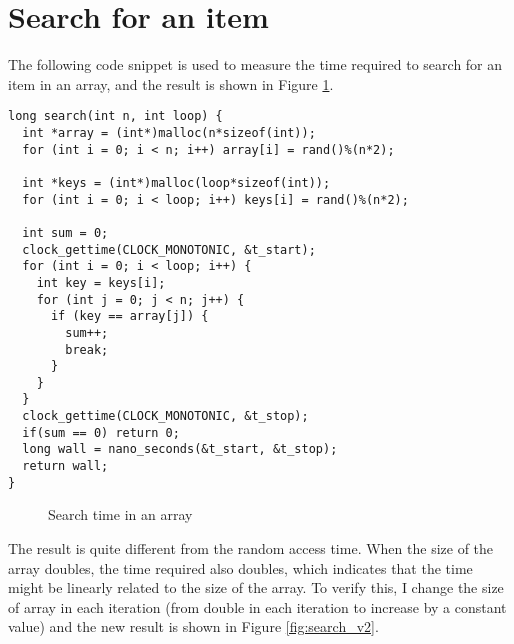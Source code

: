 \documentclass[a4paper,11pt]{article}
\begin{document}
\section*{Search for an item}

The following code snippet is used to measure the time required to search for an item in an array,
and the result is shown in Figure \ref{fig:search_v1}.

\begin{verbatim}
long search(int n, int loop) {
  int *array = (int*)malloc(n*sizeof(int));
  for (int i = 0; i < n; i++) array[i] = rand()%(n*2);
  
  int *keys = (int*)malloc(loop*sizeof(int));
  for (int i = 0; i < loop; i++) keys[i] = rand()%(n*2);

  int sum = 0;
  clock_gettime(CLOCK_MONOTONIC, &t_start);
  for (int i = 0; i < loop; i++) {
    int key = keys[i];
    for (int j = 0; j < n; j++) {
      if (key == array[j]) {
        sum++;
        break;
      }
    }
  }
  clock_gettime(CLOCK_MONOTONIC, &t_stop);
  if(sum == 0) return 0;
  long wall = nano_seconds(&t_start, &t_stop);
  return wall;
}
\end{verbatim}


\begin{figure}[H]
  \centering
  \caption{Search time in an array}
  \label{fig:search_v1}
\end{figure}

The result is quite different from the random access time. When the size of the array doubles,
the time required also doubles, which indicates that the time might be linearly related to the
size of the array. To verify this, I change the size of array in each iteration 
(from double in each iteration to increase by a constant value) and the new result is shown in 
Figure \ref{fig:search_v2}. 
\end{document}

